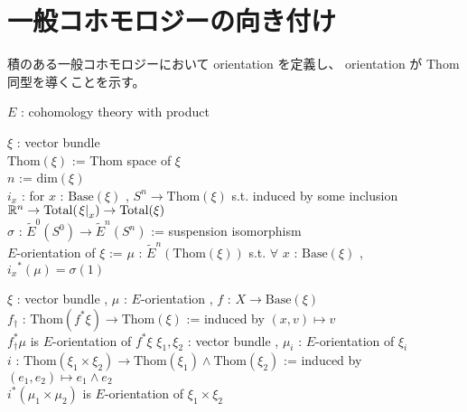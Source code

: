 \documentclass[dvipdfmx]{jsarticle}
\begin{document}
\section*{一般コホモロジーの向き付け}
積のある一般コホモロジーにおいて orientation を定義し、 orientation が Thom 同型を導くことを示す。

\begin{When}
\itemwhen
  \Fix \(E\) : cohomology theory with product \\
\end{When}

\begin{Definition}
\itemdefi
  \For \(\xi\) : vector bundle \\
  \Let \(\text{Thom}(\xi)\) := Thom space of \(\xi\) \\
  \Let \(n\) := \(\text{dim}(\xi)\) \\
  \For \(i_{x}\) : for \(x\) : \(\text{Base}(\xi)\) , \(S^n \to \text{Thom}(\xi)\) s.t. induced by some inclusion \(\mathbb{R}^n \to \text{Total}(\left. {\xi} \right| _{x}) \to \text{Total}(\xi)\) \\
  \Let \(\sigma\) : \(\tilde{E}^{0}(S^0) \to \tilde{E}^{n}(S^n)\) := suspension isomorphism \\
  \Define \(E\)-orientation of \(\xi\) := \(\mu\) : \(\tilde{E}^{n}(\text{Thom}(\xi))\) s.t. \(\forall\) \(x\) : \(\text{Base}(\xi)\) , \({i_x}^* (\mu) = \sigma(1)\)
\end{Definition}

\begin{Theorem}
\itemprop
  \For \(\xi\) : vector bundle , \(\mu\) : \(E\)-orientation , \(f\) : \(X \to \text{Base}(\xi)\)  \\
  \Let \(f_\dagger\) : \(\text{Thom}(f^* \xi) \to \text{Thom}(\xi)\) := induced by \((x,v) \mapsto v\) \\
  \Then \(f_\dagger^* \mu\) is \(E\)-orientation of \(f^*\xi\)
\itemprop
  \For \(\xi_1 , \xi_2\) : vector bundle , \(\mu_i\) : \(E\)-orientation of \(\xi_i\) \\
  \Let \(i\) : \(\text{Thom}(\xi_1 \times \xi_2) \to \text{Thom}(\xi_1) \wedge \text{Thom}(\xi_2)\) := induced by \((e_1,e_2) \mapsto e_1 \wedge e_2\) \\
  \Then \(i^*(\mu_1 \times \mu_2)\) is \(E\)-orientation of \(\xi_1 \times \xi_2\)
\end{Theorem}
\end{document}
